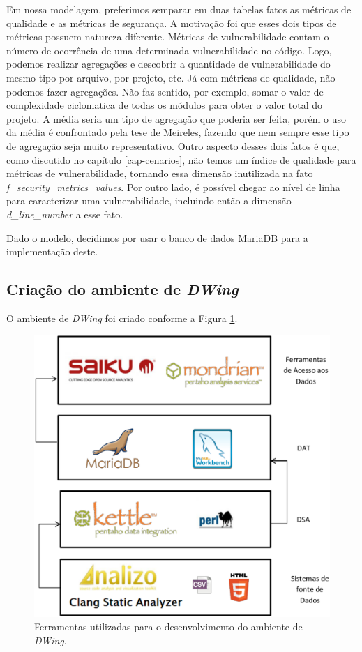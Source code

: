 Em nossa modelagem, preferimos semparar em duas tabelas fatos as métricas de qualidade e as métricas de segurança. A motivação foi que esses dois tipos de métricas possuem natureza diferente. Métricas de vulnerabilidade contam o número de ocorrência de uma determinada vulnerabilidade no código. Logo, podemos realizar agregações e descobrir a quantidade de vulnerabilidade do mesmo tipo por arquivo, por projeto, etc. Já com métricas de qualidade, não podemos fazer agregações. Não faz sentido, por exemplo, somar o valor de complexidade ciclomatica de todas os módulos para obter o valor total do projeto. A média seria um tipo de agregação que poderia ser feita, porém o uso da média é confrontado pela tese de Meireles, fazendo que nem sempre esse tipo de agregação seja muito representativo. Outro aspecto desses dois fatos é que, como discutido no capítulo \ref{cap-cenarios}, não temos um índice de qualidade para métricas de vulnerabilidade, tornando essa dimensão inutilizada na fato \emph{f\_security\_metrics\_values}. Por outro lado, é possível chegar ao nível de linha para caracterizar uma vulnerabilidade, incluindo então a dimensão \emph{d\_line\_number} a esse fato.

Dado o modelo, decidimos por usar o banco de dados MariaDB para a implementação deste.


\subsection{Criação do ambiente de \emph{DWing}}

O ambiente de \emph{DWing} foi criado conforme a Figura \ref{dw_components}.

 \begin{figure}[H]
 	\centering
 		\includegraphics[scale=0.5]{figuras/dw_components}
 		\caption{Ferramentas utilizadas para o desenvolvimento do ambiente de \emph{DWing}.}
 		\label{dw_components}
 \end{figure}


